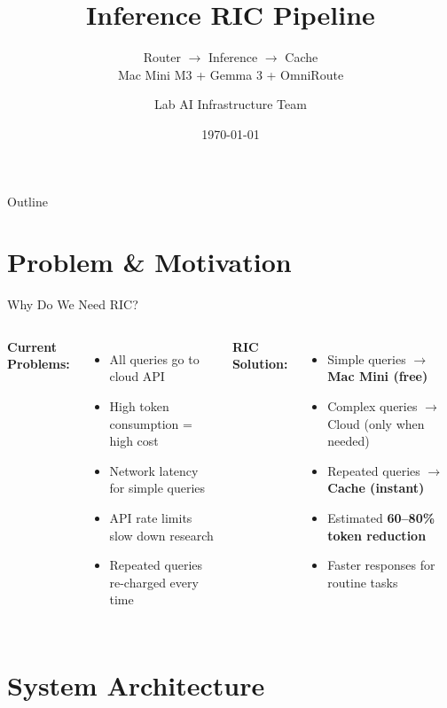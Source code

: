 \documentclass[aspectratio=169]{beamer}
\title{\textbf{Inference RIC Pipeline}}
\subtitle{Router $\rightarrow$ Inference $\rightarrow$ Cache\\
Mac Mini M3 + Gemma 3 + OmniRoute}
\author{Lab AI Infrastructure Team}
\date{\today}
\begin{document}
\begin{frame}
\titlepage
\end{frame}

\begin{frame}{Outline}
\tableofcontents
\end{frame}

\section{Problem \& Motivation}

\begin{frame}{Why Do We Need RIC?}
\begin{columns}
\textbf{\color{cloudred}Current Problems:}
\begin{itemize}
  \item All queries go to cloud API
  \item High token consumption = high cost
  \item Network latency for simple queries
  \item API rate limits slow down research
  \item Repeated queries re-charged every time
\end{itemize}
\textbf{\color{localgreen}RIC Solution:}
\begin{itemize}
  \item Simple queries $\rightarrow$ \textbf{Mac Mini (free)}
  \item Complex queries $\rightarrow$ Cloud (only when needed)
  \item Repeated queries $\rightarrow$ \textbf{Cache (instant)}
  \item Estimated \textbf{60--80\% token reduction}
  \item Faster responses for routine tasks
\end{itemize}
\end{columns}
\end{frame}

\section{System Architecture}
\end{document}
